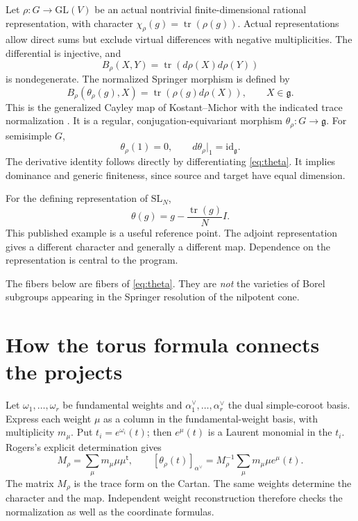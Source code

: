 \documentclass[11pt]{article}
\newcommand{\g}{\mathfrak g}
\newcommand{\tr}{\operatorname{tr}}
\begin{document}
Let $\rho:G\to\mathrm{GL}(V)$ be an actual nontrivial finite-dimensional rational representation, with character $\chi_\rho(g)=\tr(\rho(g))$. Actual representations allow direct sums but exclude virtual differences with negative multiplicities. The differential is injective, and
\begin{equation}\label{eq:trace}
 B_\rho(X,Y)=\tr(d\rho(X)d\rho(Y))
\end{equation}
is nondegenerate. The normalized Springer morphism is defined by
\begin{equation}\label{eq:theta}
 B_\rho(\theta_\rho(g),X)=\tr(\rho(g)d\rho(X)),\qquad X\in\g.
\end{equation}
This is the generalized Cayley map of Kostant--Michor with the indicated trace normalization \cite{KM}. It is a regular, conjugation-equivariant morphism $\theta_\rho:G\to\g$. For semisimple $G$,
\[
 \theta_\rho(1)=0,\qquad d\theta_\rho|_1=\mathrm{id}_{\g}.
\]
The derivative identity follows directly by differentiating \eqref{eq:theta}. It implies dominance and generic finiteness, since source and target have equal dimension.

For the defining representation of $\mathrm{SL}_N$,
\begin{equation}\label{eq:SL}
 \theta(g)=g-\frac{\tr(g)}{N}I.
\end{equation}
This published example is a useful reference point. The adjoint representation gives a different character and generally a different map. Dependence on the representation is central to the program.

The fibers below are fibers of \eqref{eq:theta}. They are \emph{not} the varieties of Borel subgroups appearing in the Springer resolution of the nilpotent cone.

\section{How the torus formula connects the projects}

Let $\omega_1,\ldots,\omega_r$ be fundamental weights and $\alpha_1^\vee,\ldots,\alpha_r^\vee$ the dual simple-coroot basis. Express each weight $\mu$ as a column in the fundamental-weight basis, with multiplicity $m_\mu$. Put $t_i=e^{\omega_i}(t)$; then $e^\mu(t)$ is a Laurent monomial in the $t_i$. Rogers's explicit determination \cite{Rogers} gives
\begin{equation}\label{eq:weight}
 M_\rho=\sum_\mu m_\mu\mu\mu^{\mathsf t},\qquad
 [\theta_\rho(t)]_{\alpha^\vee}
 =M_\rho^{-1}\sum_\mu m_\mu\mu e^\mu(t).
\end{equation}
The matrix $M_\rho$ is the trace form on the Cartan. The same weights determine the character and the map. Independent weight reconstruction therefore checks the normalization as well as the coordinate formulas.
\end{document}
